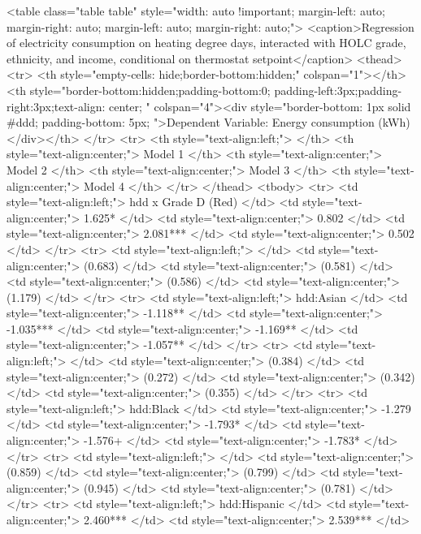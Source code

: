 <table class="table table" style="width: auto !important; margin-left: auto; margin-right: auto; margin-left: auto; margin-right: auto;">
<caption>Regression of electricity consumption on heating degree days, interacted with HOLC grade, ethnicity, and income, conditional on thermostat setpoint\label{tab:electricresponsethemset2}</caption>
 <thead>
<tr>
<th style="empty-cells: hide;border-bottom:hidden;" colspan="1"></th>
<th style="border-bottom:hidden;padding-bottom:0; padding-left:3px;padding-right:3px;text-align: center; " colspan="4"><div style="border-bottom: 1px solid #ddd; padding-bottom: 5px; ">Dependent Variable: Energy consumption (kWh)</div></th>
</tr>
  <tr>
   <th style="text-align:left;">   </th>
   <th style="text-align:center;"> Model 1 </th>
   <th style="text-align:center;"> Model 2 </th>
   <th style="text-align:center;"> Model 3 </th>
   <th style="text-align:center;"> Model 4 </th>
  </tr>
 </thead>
<tbody>
  <tr>
   <td style="text-align:left;"> hdd x Grade D (Red) </td>
   <td style="text-align:center;"> 1.625* </td>
   <td style="text-align:center;"> 0.802 </td>
   <td style="text-align:center;"> 2.081*** </td>
   <td style="text-align:center;"> 0.502 </td>
  </tr>
  <tr>
   <td style="text-align:left;">  </td>
   <td style="text-align:center;"> (0.683) </td>
   <td style="text-align:center;"> (0.581) </td>
   <td style="text-align:center;"> (0.586) </td>
   <td style="text-align:center;"> (1.179) </td>
  </tr>
  <tr>
   <td style="text-align:left;"> hdd:Asian </td>
   <td style="text-align:center;"> -1.118** </td>
   <td style="text-align:center;"> -1.035*** </td>
   <td style="text-align:center;"> -1.169** </td>
   <td style="text-align:center;"> -1.057** </td>
  </tr>
  <tr>
   <td style="text-align:left;">  </td>
   <td style="text-align:center;"> (0.384) </td>
   <td style="text-align:center;"> (0.272) </td>
   <td style="text-align:center;"> (0.342) </td>
   <td style="text-align:center;"> (0.355) </td>
  </tr>
  <tr>
   <td style="text-align:left;"> hdd:Black </td>
   <td style="text-align:center;"> -1.279 </td>
   <td style="text-align:center;"> -1.793* </td>
   <td style="text-align:center;"> -1.576+ </td>
   <td style="text-align:center;"> -1.783* </td>
  </tr>
  <tr>
   <td style="text-align:left;">  </td>
   <td style="text-align:center;"> (0.859) </td>
   <td style="text-align:center;"> (0.799) </td>
   <td style="text-align:center;"> (0.945) </td>
   <td style="text-align:center;"> (0.781) </td>
  </tr>
  <tr>
   <td style="text-align:left;"> hdd:Hispanic </td>
   <td style="text-align:center;"> 2.460*** </td>
   <td style="text-align:center;"> 2.539*** </td>
